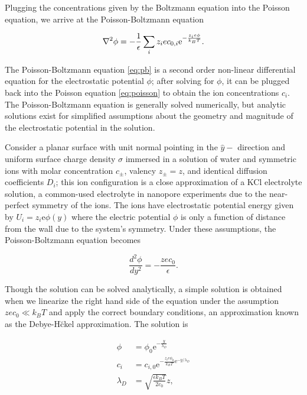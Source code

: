 			Plugging the concentrations given by the Boltzmann equation into the Poisson equation, we arrive at the Poisson-Boltzmann equation
			
			\begin{equation} \label{eq:pb}
				\mathbf{\nabla}^{2}\phi=-\frac{1}{\epsilon}\sum_{i}z_{i}ec_{0,i}\mathrm{e}^{-\frac{z_{i}e\phi}{k_{B}T}}.
			\end{equation}
			
			The Poisson-Boltzmann equation \ref{eq:pb} is a second order non-linear differential equation for the electrostatic potential $\phi$; after solving for $\phi$, it can be plugged back into the Poisson equation \ref{eq:poisson} to obtain the ion concentrations $c_{i}$. The Poisson-Boltzmann equation is generally solved numerically, but analytic solutions exist for simplified assumptions about the geometry and magnitude of the electrostatic potential in the solution. 
			
			Consider a planar surface with unit normal pointing in the $\hat{y}-$ direction and uniform surface charge density $\sigma$ immersed in a solution of water and symmetric ions with molar concentration $c_{\pm}$, valency $z_{\pm}=z$, and identical diffusion coefficients $D_{i}$; this ion configuration is a close approximation of a KCl electrolyte solution, a common-used electrolyte in nanopore experiments due to the near-perfect symmetry of the ions. The ions have electrostatic potential energy given by $U_{i}=z_{i}\mathrm{e}\phi\left(y\right)$ where the electric potential $\phi$ is only a function of distance from the wall due to the system's symmetry. Under these assumptions, the Poisson-Boltzmann equation becomes
			
			\[ \frac{d^{2}\phi}{dy^{2}}=-\frac{zec_{0}}{\epsilon}. \]
			
			Though the solution can be solved analytically, a simple solution is obtained when we linearize the right hand side of the equation under the assumption $zec_{0}\ll k_{B}T$ and apply the correct boundary conditions, an approximation known as the Debye-H\u ckel approximation. The solution is
			
			\begin{equation} \label{eq:pb1d}
				\begin{split}
					\phi &= \phi_{0}\mathrm{e}^{-\frac{y}{\lambda_{D}}} \\
					c_{i} &= c_{i,0}\mathrm{e}^{-\frac{z_{i}e\phi_{0}}{k_{B}T}\mathrm{e}^{-y/\lambda_{D}}} \\
					\lambda_{D} &= \sqrt{\frac{\epsilon k_{B}T}{2c_{0}}}z,
				\end{split}				
			\end{equation}
			
